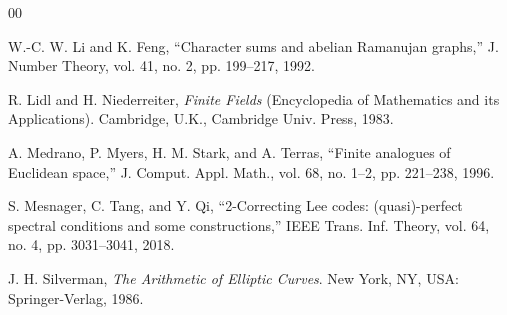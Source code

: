 \documentclass{amsart}
\numberwithin{equation}{section}
\begin{document}
\begin{thebibliography}{00}

W.-C. W. Li and K. Feng, 
``Character sums and abelian Ramanujan graphs,'' 
J. Number Theory, vol. 41, no. 2, pp. 199--217, 1992.

R. Lidl and H. Niederreiter, 
\emph{Finite Fields} (Encyclopedia of Mathematics
and its Applications). Cambridge, U.K., Cambridge Univ. Press, 1983.


A. Medrano, P. Myers, H. M. Stark, and A. Terras,
``Finite analogues of Euclidean space,''
J. Comput. Appl. Math., vol. 68, no. 1--2, pp. 221--238, 1996.

S. Mesnager, C. Tang, and Y. Qi,
``2-Correcting Lee codes: (quasi)-perfect spectral
conditions and some constructions,''
IEEE Trans. Inf. Theory, vol. 64, no. 4, pp. 3031--3041, 2018.


J. H. Silverman, 
\emph{The Arithmetic of Elliptic Curves}. New York, NY, USA:
Springer-Verlag, 1986.




\end{thebibliography}
\end{document}
